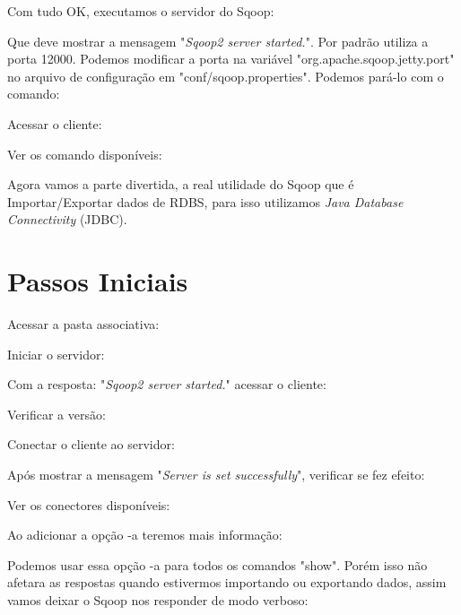 \documentclass[a4paper,11pt]{article}
\begin{document}
Com tudo OK, executamos o servidor do Sqoop: \\

Que deve mostrar a mensagem "\textit{Sqoop2 server started.}". Por padrão utiliza a porta 12000. Podemos modificar a porta na variável "org.apache.sqoop.jetty.port" no arquivo de configuração em "conf/sqoop.properties". Podemos pará-lo com o comando: \\

Acessar o cliente: \\

Ver os comando disponíveis: \\

Agora vamos a parte divertida, a real utilidade do Sqoop que é Importar/Exportar dados de RDBS, para isso utilizamos \textit{Java Database Connectivity} (JDBC).

\section{Passos Iniciais}
Acessar a pasta associativa: \\

Iniciar o servidor: \\

Com a resposta: "\textit{Sqoop2 server started.}" acessar o cliente: \\

Verificar a versão: \\

Conectar o cliente ao servidor: \\

Após mostrar a mensagem "\textit{Server is set successfully}", verificar se fez efeito: \\

Ver os conectores disponíveis: \\

Ao adicionar a opção -a teremos mais informação: \\

Podemos usar essa opção -a para todos os comandos "show". Porém isso não afetara as respostas quando estivermos importando ou exportando dados, assim vamos deixar o Sqoop nos responder de modo verboso: \\
\end{document}
